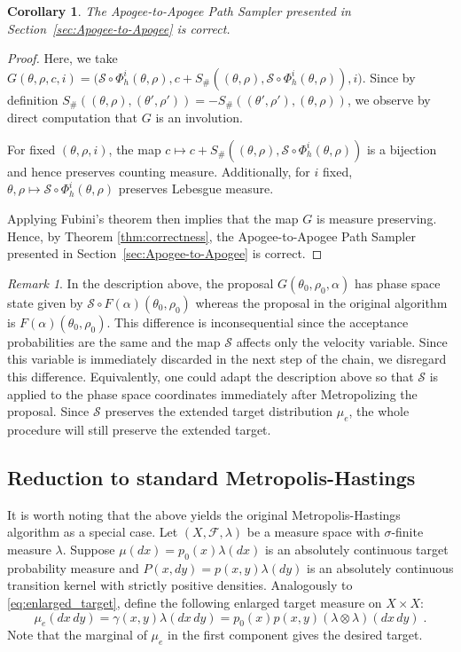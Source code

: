 \documentclass[letterpaper,11pt]{article}
\theoremstyle{plain}%
\newtheorem{corollary}[prototheorem]{Corollary}
\theoremstyle{remark}
\newtheorem{remark}{Remark}
\begin{document}
\begin{corollary}
The Apogee-to-Apogee Path Sampler presented in Section~\ref{sec:Apogee-to-Apogee} is correct.
\end{corollary}

\begin{proof}
Here, we take $G(\theta, \rho, c, i)= \Big(\mathcal{S} \circ \Phi_h^i(\theta, \rho), c + S_{\#}((\theta, \rho), \mathcal{S} \circ \Phi_h^i(\theta, \rho)), i \Big)$. Since by definition $S_\#((\theta, \rho), (\theta', \rho')) = - S_\#((\theta', \rho'), (\theta, \rho))$, we observe by direct computation that $G$ is an involution. 

For fixed $(\theta, \rho, i)$, the map $c \mapsto c + S_{\#}((\theta, \rho), \mathcal{S} \circ \Phi_h^i(\theta, \rho))$ is a bijection and hence preserves counting measure. Additionally, for $i$ fixed, $\theta, \rho \mapsto \mathcal{S} \circ \Phi_h^i(\theta, \rho)$ preserves Lebesgue measure.

Applying Fubini's theorem then implies that the map $G$ is measure preserving. Hence, by Theorem \ref{thm:correctness}, the Apogee-to-Apogee Path Sampler presented in Section~\ref{sec:Apogee-to-Apogee} is correct. \end{proof}

\begin{remark}
In the description above, the proposal $G(\theta_0, \rho_0, \alpha)$ has phase space state given by $\mathcal{S} \circ F(\alpha)(\theta_0, \rho_0)$ whereas the proposal in the original algorithm is $F(\alpha)(\theta_0, \rho_0)$. This difference is inconsequential since the acceptance probabilities are the same and the map $\mathcal{S}$ affects only the velocity variable. Since this variable is immediately discarded in the next step of the chain, we disregard this difference. Equivalently, one could adapt the description above so that $\mathcal{S}$ is applied to the phase space coordinates immediately after Metropolizing the proposal. Since $\mathcal{S}$ preserves the extended target distribution $\mu_e$, the whole procedure will still preserve the extended target.
\end{remark}


\subsection{Reduction to standard Metropolis-Hastings}

It is worth noting that the above yields the original Metropolis-Hastings algorithm as a special case. Let $(X, \mathcal{F}, \lambda)$ be a measure space with $\sigma$-finite measure $\lambda$. Suppose $\mu(dx) = p_0(x) \lambda(dx)$ is an absolutely continuous target probability measure and $P(x, dy) = p(x,y) \lambda(dy)$ is an absolutely continuous transition kernel with strictly positive  densities. Analogously to \eqref{eq:enlarged_target}, define the following enlarged target measure on $X \times X$: \[
\mu_e(dx \, dy) = \gamma(x,y) \lambda(dx \, dy) = p_0(x) p(x,y) (\lambda \otimes \lambda)(dx \, dy) \;.
\] 
Note that the marginal of $\mu_e$ in the first component gives the desired target.  
\end{document}
